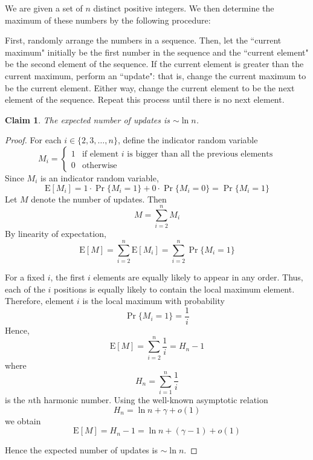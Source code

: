 \documentclass{article}
\newtheorem{claim}{Claim}
\begin{document}
We are given a set of $n$ distinct positive integers. We then determine the maximum of these numbers by the 
following procedure: 

\medskip

First, randomly arrange the numbers in a sequence. Then, let the ``current maximum" 
initially be the first number in the sequence and the ``current element" be the second element of the 
sequence. If the current element is greater than the current maximum, perform an ``update": that is, change 
the current maximum to be the current element. Either way, change the current element to be the next element 
of the sequence. Repeat this process until there is no next element.

\begin{claim}
    The expected number of updates is $\sim \ln n$.
\end{claim}

\begin{proof}
    For each $i \in \{2, 3, \dots, n\}$, define the indicator random variable
    \[
    M_i =
    \begin{cases}
    1 & \text{if element } i \text{ is bigger than all the previous elements} \\
    0 & \text{otherwise}
    \end{cases}
    \]
    Since $M_i$ is an indicator random variable,
    \[
    \mathrm{E}[M_i] = 1 \cdot \Pr\{M_i = 1\} + 0 \cdot \Pr\{M_i = 0\} = \Pr\{M_i = 1\}
    \]
    Let $M$ denote the number of updates. Then 
    \[
    M = \sum_{i=2}^{n}M_i
    \]
    By linearity of expectation, 
    \[
    \mathrm{E}[M] = \sum_{i=2}^{n}\mathrm{E}[M_i] = \sum_{i=2}^{n}\Pr\{M_i = 1\}
    \]

    \medskip

    For a fixed $i$, the first $i$ elements are equally likely to appear in any order. Thus, each of the $i$ 
    positions is equally likely to contain the local maximum element. Therefore, element $i$ is the local 
    maximum with probability
    \[
    \Pr\{M_i = 1\} = \frac{1}{i}
    \]
    Hence, 
    \[
    \mathrm{E}[M] = \sum_{i=2}^{n}\frac{1}{i} = H_n - 1
    \]
    where
    \[
    H_n = \sum_{i=1}^{n}\frac{1}{i}
    \]
    is the $n$th harmonic number. Using the well-known asymptotic relation
    \[
    H_n = \ln n + \gamma + o(1)
    \]
    we obtain 
    \[
    \mathrm{E}[M] = H_n - 1 = \ln n + (\gamma - 1) + o(1)
    \]

    \medskip

    Hence the expected number of updates is $\sim \ln n$.
\end{proof}
\end{document}

